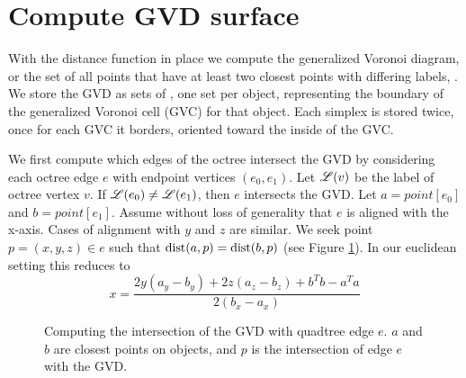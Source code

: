 \documentclass{egpubl}
\begin{document}
\section{Compute GVD surface}
\label{sec:bisector}

With the distance function in place we compute the generalized Voronoi diagram, or the set of all points that have at least two closest points with differing labels, . We store the GVD as sets of , one set per object, representing the boundary of the generalized Voronoi cell (GVC) for that object.  Each simplex is stored twice, once for each GVC it borders, oriented toward the inside of the GVC.

We first compute which edges of the octree intersect the GVD by considering each octree edge $e$ with endpoint vertices $(e_0, e_1)$.
Let $\mathscr{L}(v)$ be the label of octree vertex $v$.  If $\mathscr{L}(e_0) \ne \mathscr{L}(e_1)$, then $e$ intersects the GVD.  Let $a=point[e_0]$ and $b=point[e_1]$.  Assume without loss of generality that $e$ is aligned with the x-axis.  Cases of alignment with $y$ and $z$ are similar.  We seek point $p=(x,y,z) \in e$ such that $\text{dist}(a,p)=\text{dist}(b,p)$ (see Figure \ref{fig:compute-q}). In our euclidean setting this reduces to
\begin{equation}
x = \frac{2y(a_y-b_y)+2z(a_z-b_z)+b^Tb - a^Ta}{2(b_x-a_x)}
\end{equation}

\begin{figure}
  \centering
  \caption{Computing the intersection of the GVD with quadtree edge $e$. $a$ and $b$ are closest points on objects, and $p$ is the intersection of edge $e$ with the GVD.
  }
  \label{fig:compute-q}
\end{figure}
\end{document}
